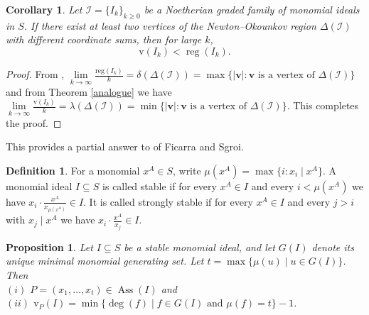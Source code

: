 \documentclass[11pt,reqno,a4paper]{amsart}
\newcommand{\Ass}{\operatorname{Ass}}
\newtheorem{corollary}[theorem]{Corollary}
\newtheorem{proposition}[theorem]{Proposition}
\theoremstyle{definition}
\newtheorem{definition}[theorem]{Definition}
\begin{document}
\begin{corollary}\label{v(Ik)<reg(Ik)formonomialideals}
    Let $\mathcal{I} = \{ I_k \}_{k \geq 0}$ be a Noetherian graded family of monomial ideals in $S$. If there exist at least two vertices of the Newton--Okounkov region $\Delta(\mathcal{I})$ with different coordinate sums, then for large $k$,
    \[\mathrm{v}(I_k) < \operatorname{reg}(I_k).\]
\end{corollary}



\begin{proof}

From  \cite[Theorem 5.1]{HaNguyenNguyen25}, $\lim\limits_{k\to\infty}\frac{\mathrm{reg}(I_k)}{k}=\delta(\Delta(\mathcal{I})) = \max\{ |\mathbf{v}| : \mathbf{v} \text{ is a vertex of } \Delta(\mathcal{I}) \}$ and from Theorem \ref{analogue} we have $\lim\limits_{k\to\infty}\frac{\mathrm{v}(I_k)}{k}=\lambda(\Delta(\mathcal{I})) = \min\{ |\mathbf{v}| : \mathbf{v} \text{ is a vertex of } \Delta(\mathcal{I}) \}$. This completes the proof.





    
\end{proof}

This provides a partial answer to \cite[Question 5.1]{FicarraSgroi24} of Ficarra and Sgroi.
    


\begin{definition}

 For a monomial \( x^{A} \in S \), write \( \mu(x^{A}) = \max\{ i : x_i \mid x^{A} \} \). A monomial ideal \( I \subseteq S \) is called stable if for every \( x^{A} \in I \) and every \( i < \mu(x^{A}) \) we have \( x_i \cdot \frac{x^{A}}{x_{\mu(x^{A})}} \in I \). It is called strongly stable if for every \( x^{A} \in I \) and every \( j > i \) with \( x_j \mid x^{A} \) we have \( x_i \cdot \frac{x^{A}}{x_j} \in I \).

    
\end{definition}






\begin{proposition}\label{thm:stable-quotient}
Let  $I \subseteq S$ be a stable monomial ideal, and let \( G(I) \) denote its unique minimal monomial generating set. Let $t= \max\{ \mu(u) \mid u \in G(I)\}$. Then\\
$(i)$ $P=(x_1, \ldots, x_t)\in \Ass(I)$ and\\
$(ii)$ $\mathrm{v}_P(I) = \min\{\deg(f) \mid f \in G(I) \text{ and } \mu(f)=t\} - 1$.


\end{proposition}
\end{document}
